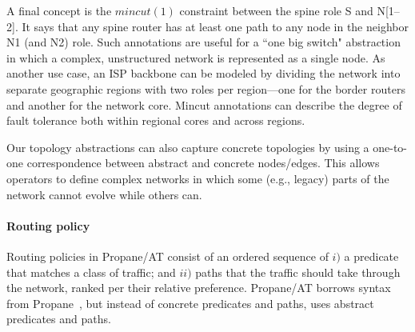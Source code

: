 \documentclass[numbers, 10pt, preprint]{sigplanconf}
\newcommand{\sysname}{{\text{}\small \sf Propane/AT}\xspace}
\newcommand{\Propane}{{\text{}\small \sf Propane}\xspace}
\newcommand{\para}[1]{\paragraph*{\textbf{#1}}}
\newcommand{\Mincut}{\mathit{mincut}}
\begin{document}
A final concept is the $\Mincut(1)$ constraint between the spine role S and N[1--2]. It says that any spine router has at least one path to any node in the neighbor N1 (and N2) role. Such annotations are useful for a ``one big switch" abstraction \cite{Casado:2010} in which a complex, unstructured network is represented as a single node. As another use case, an ISP backbone can be modeled by dividing the network into separate geographic regions with two roles per region---one for the border routers and another for the network core. Mincut annotations can describe the degree of fault tolerance both within regional cores and across regions.

Our topology abstractions can also capture concrete topologies by using a one-to-one correspondence between abstract and concrete nodes/edges. This allows operators to define complex networks in which some (e.g., legacy) parts of the network cannot evolve while others can.


%


\para{Routing policy} Routing policies in \sysname consist of an ordered sequence of $i)$ a predicate that matches a class of traffic; and $ii)$ paths that the traffic should take through the network, ranked per their relative preference. \sysname borrows syntax from \Propane~\cite{propane}, but instead of concrete predicates and paths, uses abstract predicates and paths.
\end{document}
